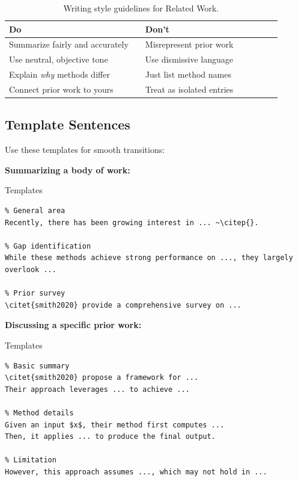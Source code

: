 \documentclass[]{fairmeta} %
\theoremstyle{plain}
\theoremstyle{definition}
\theoremstyle{remark}
\begin{document}
\begin{table}[htbp]
  \centering
  \small
  \begin{tabular}{p{0.45\linewidth} p{0.45\linewidth}}
    \toprule
    \textbf{Do} & \textbf{Don't} \\
    \midrule
    Summarize fairly and accurately & Misrepresent prior work \\
    Use neutral, objective tone & Use dismissive language \\
    Explain \emph{why} methods differ & Just list method names \\
    Connect prior work to yours & Treat as isolated entries \\
    \bottomrule
  \end{tabular}
  \caption{Writing style guidelines for Related Work.}
  \label{tab:rw-style}
\end{table}


\subsection{Template Sentences}
\label{sec:rw-templates}

Use these templates for smooth transitions:

\bigskip
\noindent\textbf{Summarizing a body of work:}

\begin{promptbox}{Templates}
\begin{verbatim}
% General area
Recently, there has been growing interest in ... ~\citep{}.

% Gap identification
While these methods achieve strong performance on ..., they largely overlook ...

% Prior survey
\citet{smith2020} provide a comprehensive survey on ...
\end{verbatim}
\end{promptbox}

\bigskip
\noindent\textbf{Discussing a specific prior work:}

\begin{promptbox}{Templates}
\begin{verbatim}
% Basic summary
\citet{smith2020} propose a framework for ...
Their approach leverages ... to achieve ...

% Method details
Given an input $x$, their method first computes ...
Then, it applies ... to produce the final output.

% Limitation
However, this approach assumes ..., which may not hold in ...
\end{verbatim}
\end{promptbox}
\end{document}
